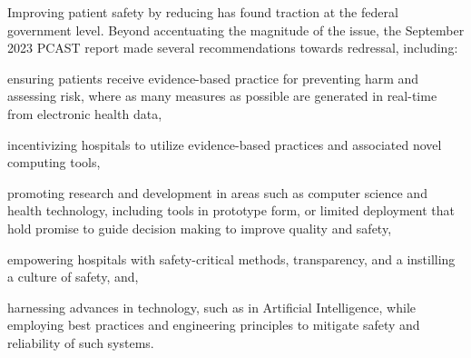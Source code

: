 Improving patient safety by reducing \PMEs{} has found traction at the federal
government level. Beyond accentuating the magnitude of the \PME{} issue,
the September 2023 PCAST report made several recommendations towards redressal, including:
\begin{enumerate*}[label=(\roman*)]
  \item ensuring patients receive evidence-based practice for preventing
    harm and assessing risk, where as many measures as possible are
    generated in real-time from electronic health data,
  \item incentivizing hospitals to utilize evidence-based practices
    and associated novel computing tools,
  \item promoting research and development in areas such as
    computer science and health technology,
    including tools in prototype form, or limited deployment that
    hold promise to guide decision making to improve quality and safety,
  \item empowering hospitals with safety-critical methods, transparency,
    and a instilling a culture of safety, and,
  \item harnessing advances in technology, such as in Artificial Intelligence,
    while employing best practices and engineering principles to mitigate safety
    and reliability of such systems.
\end{enumerate*}

